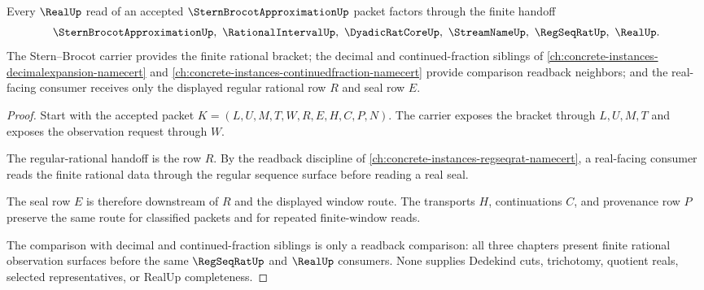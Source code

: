 \begin{theorem}\label{thm:stern-brocot-approximation-real-seal-handoff}
Every $\RealUp$ read of an accepted $\SternBrocotApproximationUp$ packet factors through the finite handoff
$$
\SternBrocotApproximationUp,\ \RationalIntervalUp,\ \DyadicRatCoreUp,\ \StreamNameUp,\ \RegSeqRatUp,\ \RealUp .
$$
The Stern--Brocot carrier provides the finite rational bracket; the decimal and continued-fraction siblings of \autoref{ch:concrete-instances-decimalexpansion-namecert} and \autoref{ch:concrete-instances-continuedfraction-namecert} provide comparison readback neighbors; and the real-facing consumer receives only the displayed regular rational row $R$ and seal row $E$.
\end{theorem}
\begin{proof}
Start with the accepted packet $K=(L,U,M,T,W,R,E,H,C,P,N)$. The carrier exposes the bracket through $L,U,M,T$ and exposes the observation request through $W$.

The regular-rational handoff is the row $R$. By the readback discipline of \autoref{ch:concrete-instances-regseqrat-namecert}, a real-facing consumer reads the finite rational data through the regular sequence surface before reading a real seal.

The seal row $E$ is therefore downstream of $R$ and the displayed window route. The transports $H$, continuations $C$, and provenance row $P$ preserve the same route for classified packets and for repeated finite-window reads.

The comparison with decimal and continued-fraction siblings is only a readback comparison: all three chapters present finite rational observation surfaces before the same $\RegSeqRatUp$ and $\RealUp$ consumers. None supplies Dedekind cuts, trichotomy, quotient reals, selected representatives, or RealUp completeness.
\end{proof}

\begin{closurestatus}{\SternBrocotApproximationUp}
  \theoryclosure{\seedClosure}
  \formalstatus{\unformalizedV}
\end{closurestatus}
